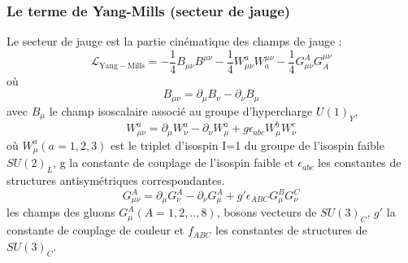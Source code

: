 \subsubsection{Le terme de Yang-Mills (secteur de jauge)}
Le secteur de jauge est la partie cinématique des champs de jauge :
\begin{equation}
\mathcal{L}_{\mathrm{Yang-Mills}}=-\frac{1}{4}B_{\mu\nu}B^{\mu\nu}-\frac{1}{4}W_{\mu\nu}^{a}W_{a}^{\mu\nu}-\frac{1}{4}G_{\mu\nu}^{A}G_{A}^{\mu\nu}
\end{equation}
où 
\begin{equation}
B_{\mu\nu}=\partial_{\mu}B_{\nu}-\partial_{\nu}B_{\mu}
\end{equation}
avec $B_{\mu}$ le champ isoscalaire associé au groupe d'hypercharge $U(1)_{Y}$,
\begin{equation}
W_{\mu\nu}^{a}=\partial_{\mu}W_{\nu}^{a}-\partial_{\nu}W_{\mu}^{a}+g\epsilon_{abc}W_{\mu}^{b}W_{\nu}^{c}
\end{equation}
où $W_{\mu}^{a} (a=1,2,3)$ est le triplet d'isospin I=1 du groupe de l'isospin faible $SU(2)_{L}$, g la constante de couplage de l'isospin faible et $\epsilon_{abc}$ les constantes de structures antisymétriques correspondantes.  
\begin{equation}
G_{\mu\nu}^{A}=\partial_{\mu}G_{\nu}^{A}-\partial_{\nu}G_{\mu}^{A}+g'\epsilon_{ABC}G_{\mu}^{B}G_{\nu}^{C}
\end{equation}
les champs des gluons $G_{\mu}^{A} (A=1,2,..,8)$, bosons vecteurs de $SU(3)_{C}$, $g'$ la constante de couplage de couleur et $f_{ABC}$ les constantes de structures de $SU(3)_{C}$.







 
    
  
 
 

